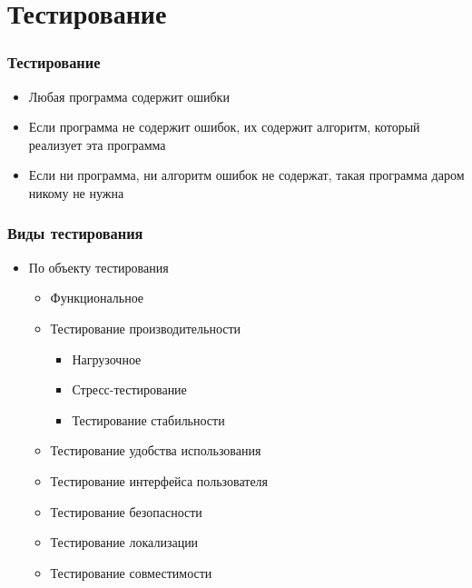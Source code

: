 \documentclass{../../slides-style}
\begin{document}
    \section{Тестирование}

    \begin{frame}
        \frametitle{Тестирование}
        \begin{itemize}
            \item Любая программа содержит ошибки
            \item Если программа не содержит ошибок, их содержит алгоритм, который реализует эта программа
            \item Если ни программа, ни алгоритм ошибок не содержат, такая программа даром никому не нужна
        \end{itemize}
    \end{frame}

    \begin{frame}
        \frametitle{Виды тестирования}
        \begin{itemize}
            \item По объекту тестирования
            \begin{itemize}
                \item Функциональное
                \item Тестирование производительности
                \begin{itemize}
                    \item Нагрузочное
                    \item Стресс-тестирование
                    \item Тестирование стабильности
                \end{itemize}
                \item Тестирование удобства использования
                \item Тестирование интерфейса пользователя
                \item Тестирование безопасности
                \item Тестирование локализации
                \item Тестирование совместимости
            \end{itemize}
        \end{itemize}
    \end{frame}
\end{document}
